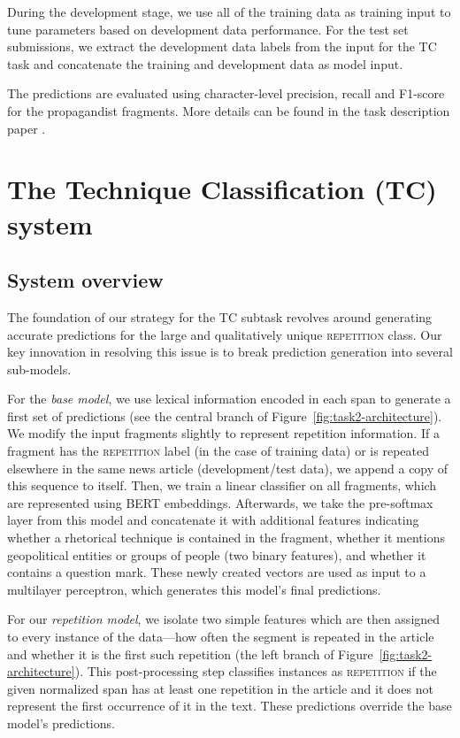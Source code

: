 \documentclass[11pt]{article}
\begin{document}
During the development stage, we use
all of the training data as training input to tune parameters based on development data performance.
For the test set submissions, we extract the development data labels from the input for the TC task and concatenate the training and development data as model input.

The predictions are evaluated using character-level precision, recall and F1-score for the propagandist fragments.
More details can be found in the task description paper \cite{DaSanMartinoSemeval20task11}.


\section{The Technique Classification (TC) system}


\subsection{System overview}
The foundation of our strategy for the TC subtask revolves around generating accurate predictions for the large and qualitatively unique \textsc{repetition} class.  
Our key innovation in resolving this issue is to break prediction generation into several sub-models.

For the \textit{base model}, we use lexical information encoded in each span to generate a first set of predictions (see the central branch of Figure~\ref{fig:task2-architecture}).
We modify the input fragments slightly to represent repetition information.
If a fragment has the \textsc{repetition} label (in the case of training data) or is repeated elsewhere in the same news article (development/test data), we append a copy of this sequence to itself.
Then, we train a linear classifier on all fragments, which are represented using BERT embeddings.
Afterwards, we take the pre-softmax layer from this model and concatenate it with additional features
indicating whether a rhetorical technique is contained in the fragment, whether it mentions geopolitical entities or groups of people (two binary features), and whether it contains a question mark.
These newly created vectors are used as input to a multilayer perceptron, which generates this model's final predictions.

For our \textit{repetition model}, we isolate two simple features which are then assigned to every instance of the data---how often the segment is repeated in the article and whether it is the first such repetition (the left branch of Figure~\ref{fig:task2-architecture}).
This post-processing step classifies instances as \textsc{repetition} if the given normalized span has at least one repetition in the article and it does not represent the first occurrence of it in the text.
These predictions override the base model's predictions.
\end{document}
